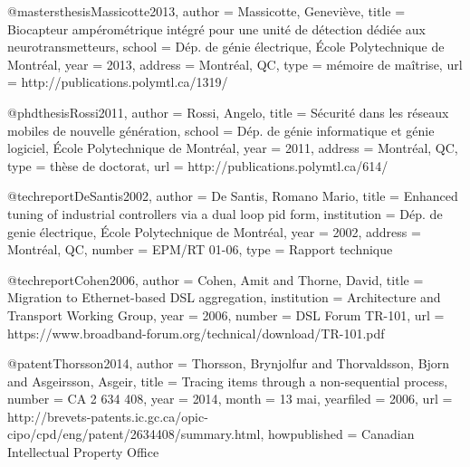 @mastersthesis{Massicotte2013,
author = {Massicotte, Geneviève},
title = {Biocapteur ampérométrique intégré pour une unité de détection dédiée aux neurotransmetteurs},
school = {Dép. de génie électrique, École Polytechnique de Montréal}, 
year = {2013},
address = {Montréal, QC},
type = {mémoire de maîtrise},		
url = {http://publications.polymtl.ca/1319/}
}





@phdthesis{Rossi2011,
author = {Rossi, Angelo},
title = {Sécurité dans les réseaux mobiles de nouvelle génération},
school = {Dép. de génie informatique et génie logiciel, École Polytechnique de Montréal},
year = {2011},
address = {Montréal, QC},
type = {thèse de doctorat},		
url = {http://publications.polymtl.ca/614/}
}





@techreport{DeSantis2002,
author = {De Santis, Romano Mario},
title = {Enhanced tuning of industrial controllers via a dual loop {pid} form},
institution = {Dép. de genie électrique, École Polytechnique de Montréal},
year = {2002},
address = {Montréal, QC},
number = {EPM/RT 01-06},
type = {Rapport technique}		
}
 
 
 
  

@techreport{Cohen2006,
author = {Cohen, Amit and Thorne, David},
title = {Migration to {E}thernet-based {DSL} aggregation},
institution = {Architecture and Transport Working Group},
year = {2006},
number = {DSL Forum TR-101},
url = {https://www.broadband-forum.org/technical/download/TR-101.pdf}
}




@patent{Thorsson2014,
author = {Thorsson, Brynjolfur and Thorvaldsson, Bjorn and Asgeirsson, Asgeir}, 
title = {Tracing items through a non-sequential process},
number = {CA 2 634 408},		
year = {2014},
month = {13 mai},			
yearfiled = {2006},
url = {http://brevets-patents.ic.gc.ca/opic-cipo/cpd/eng/patent/2634408/summary.html},
howpublished = {Canadian Intellectual Property Office}
}

